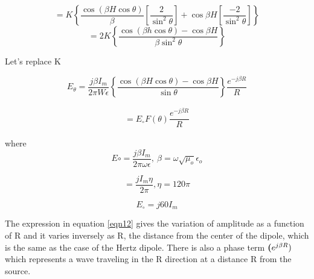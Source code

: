 $$=K\left\lbrace\dfrac{\cos(\beta H\cos \theta)}{\beta} \left[\dfrac{2}{\sin^{2}\theta}\right] + \cos \beta H\left[\dfrac{-2}{\sin^{2}\theta}\right] \right\rbrace$$
$$=2K \left\lbrace\dfrac{\cos(\beta h\cos\theta) - \cos\beta H}{\beta\sin^{2}\theta}\right\rbrace$$

Let's replace K

$$E_{\theta} = \dfrac{j\beta I_m}{2\pi W\epsilon}\left\{\dfrac{\cos(\beta H\cos \theta)- \cos \beta H}{\sin\theta}\right\} \dfrac{e^{-j\beta R}}{R}$$

\begin{align}
	=E_\circ F(\theta) \dfrac{e^{-j\beta R}}{R}
	\label{eqn12}
\end{align}

where $$E\circ= \dfrac{j\beta I_m}{2\pi \omega\epsilon} ,\ \beta=\omega\sqrt{\mu_o} \epsilon_o$$ 

$$ =\dfrac{jI_m\eta}{2\pi}, \eta =120\pi$$

$$E_\circ= j60I_m $$
	
The expression in equation \ref{eqn12} gives the variation of amplitude as a function of R and it varies inversely as R, the distance from the center of the dipole, which is the same as the case of the Hertz dipole. There is also a phase term $\textbf(e^{j\beta R})$ which represents a wave traveling in the R direction at a distance R from the source.

